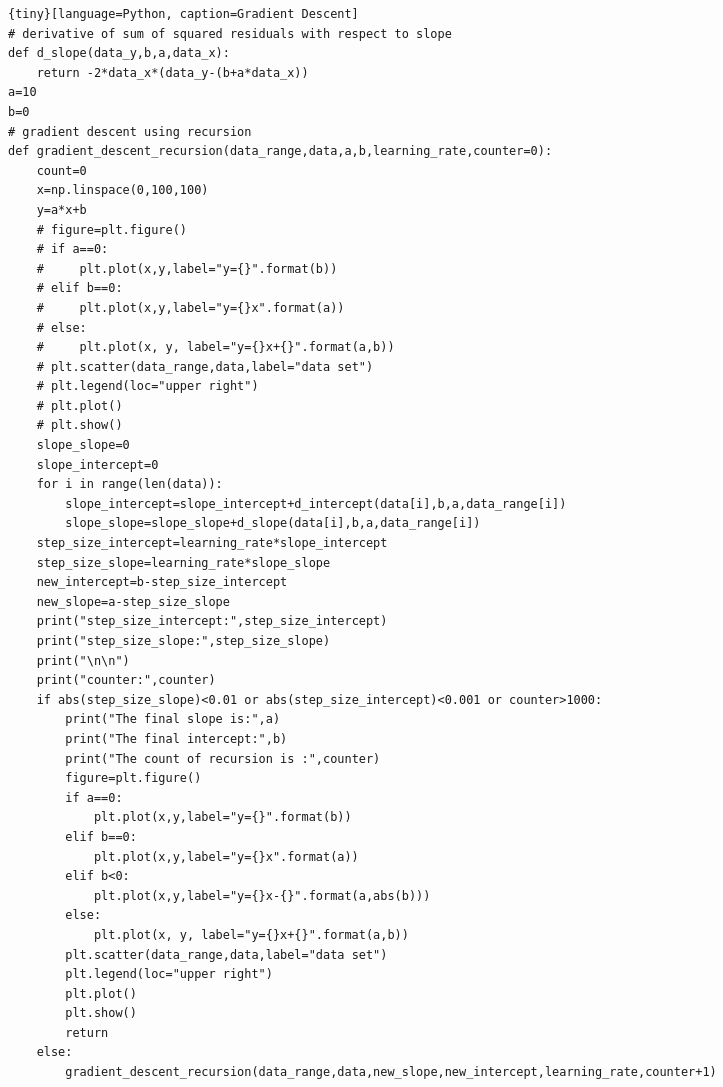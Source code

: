 \documentclass[a4paper,12pt]{article}
\begin{document}
\begin{spacing}{2}
\begin{tiny}
\begin{lstlisting}{tiny}[language=Python, caption=Gradient Descent]
# derivative of sum of squared residuals with respect to slope
def d_slope(data_y,b,a,data_x):
    return -2*data_x*(data_y-(b+a*data_x))
a=10
b=0
# gradient descent using recursion
def gradient_descent_recursion(data_range,data,a,b,learning_rate,counter=0):
    count=0
    x=np.linspace(0,100,100)
    y=a*x+b
    # figure=plt.figure()
    # if a==0:
    #     plt.plot(x,y,label="y={}".format(b))
    # elif b==0:
    #     plt.plot(x,y,label="y={}x".format(a))
    # else:
    #     plt.plot(x, y, label="y={}x+{}".format(a,b))
    # plt.scatter(data_range,data,label="data set")
    # plt.legend(loc="upper right")
    # plt.plot()
    # plt.show()
    slope_slope=0
    slope_intercept=0
    for i in range(len(data)):
        slope_intercept=slope_intercept+d_intercept(data[i],b,a,data_range[i])
        slope_slope=slope_slope+d_slope(data[i],b,a,data_range[i])
    step_size_intercept=learning_rate*slope_intercept
    step_size_slope=learning_rate*slope_slope
    new_intercept=b-step_size_intercept
    new_slope=a-step_size_slope
    print("step_size_intercept:",step_size_intercept)
    print("step_size_slope:",step_size_slope)
    print("\n\n")
    print("counter:",counter)
    if abs(step_size_slope)<0.01 or abs(step_size_intercept)<0.001 or counter>1000:
        print("The final slope is:",a)
        print("The final intercept:",b)
        print("The count of recursion is :",counter)
        figure=plt.figure()
        if a==0:
            plt.plot(x,y,label="y={}".format(b))
        elif b==0:
            plt.plot(x,y,label="y={}x".format(a))
        elif b<0:
            plt.plot(x,y,label="y={}x-{}".format(a,abs(b)))
        else:
            plt.plot(x, y, label="y={}x+{}".format(a,b))
        plt.scatter(data_range,data,label="data set")
        plt.legend(loc="upper right")
        plt.plot()
        plt.show()
        return
    else:
        gradient_descent_recursion(data_range,data,new_slope,new_intercept,learning_rate,counter+1)



\end{lstlisting}
\end{tiny}
\end{spacing}
\end{document}
